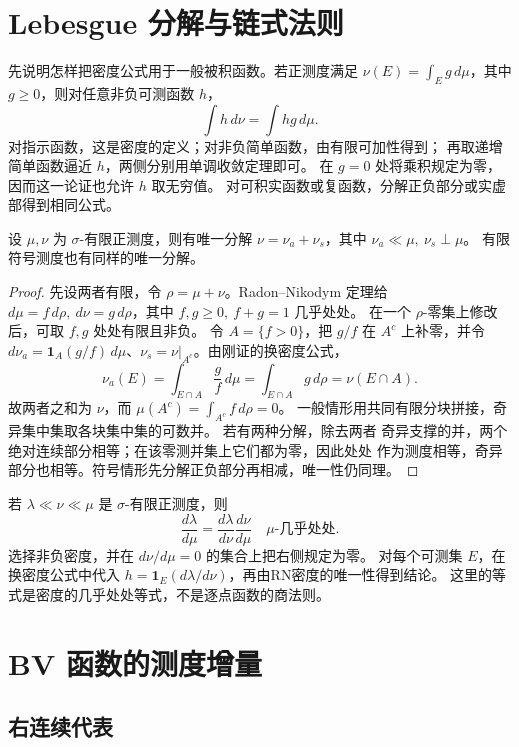 \section{Lebesgue 分解与链式法则}

先说明怎样把密度公式用于一般被积函数。若正测度满足
\(\nu(E)=\int_Eg\,d\mu\)，其中 \(g\ge0\)，则对任意非负可测函数 \(h\)，
\[
 \int h\,d\nu=\int hg\,d\mu.
\]
对指示函数，这是密度的定义；对非负简单函数，由有限可加性得到；
再取递增简单函数逼近 \(h\)，两侧分别用单调收敛定理即可。
在 \(g=0\) 处将乘积规定为零，因而这一论证也允许 \(h\) 取无穷值。
对可积实函数或复函数，分解正负部分或实虚部得到相同公式。

\begin{theorem}\label{thm:lebesgue-decomposition}
设 \(\mu,\nu\) 为 \(\sigma\)-有限正测度，则有唯一分解
\(\nu=\nu_a+\nu_s\)，其中 \(\nu_a\ll\mu,\ \nu_s\perp\mu\)。
有限符号测度也有同样的唯一分解。
\end{theorem}
\begin{proof}
先设两者有限，令 \(\rho=\mu+\nu\)。Radon--Nikodym 定理给
\(d\mu=f\,d\rho,\ d\nu=g\,d\rho\)，其中 \(f,g\ge0,\ f+g=1\) 几乎处处。
在一个 \(\rho\)-零集上修改后，可取 \(f,g\) 处处有限且非负。
令 \(A=\{f>0\}\)，把 \(g/f\) 在 \(A^c\) 上补零，并令
\(d\nu_a=\mathbf1_A(g/f)\,d\mu\)、\(\nu_s=\nu|_{A^c}\)。由刚证的换密度公式，
\[
 \nu_a(E)=\int_{E\cap A}\frac{g}{f}\,d\mu
          =\int_{E\cap A}g\,d\rho=\nu(E\cap A).
\]
故两者之和为 \(\nu\)，而 \(\mu(A^c)=\int_{A^c}f\,d\rho=0\)。
一般情形用共同有限分块拼接，奇异集中集取各块集中集的可数并。
若有两种分解，除去两者
奇异支撑的并，两个绝对连续部分相等；在该零测并集上它们都为零，因此处处
作为测度相等，奇异部分也相等。符号情形先分解正负部分再相减，唯一性仍同理。
\end{proof}

若 \(\lambda\ll\nu\ll\mu\) 是 \(\sigma\)-有限正测度，则
\[
 \frac{d\lambda}{d\mu}
 =\frac{d\lambda}{d\nu}\frac{d\nu}{d\mu}\quad\mu\text{-几乎处处}.
\]
选择非负密度，并在 \(d\nu/d\mu=0\) 的集合上把右侧规定为零。
对每个可测集 \(E\)，在换密度公式中代入
\(h=\mathbf1_E(d\lambda/d\nu)\)，再由RN密度的唯一性得到结论。
这里的等式是密度的几乎处处等式，不是逐点函数的商法则。

\section{BV 函数的测度增量}

\subsection{右连续代表}

